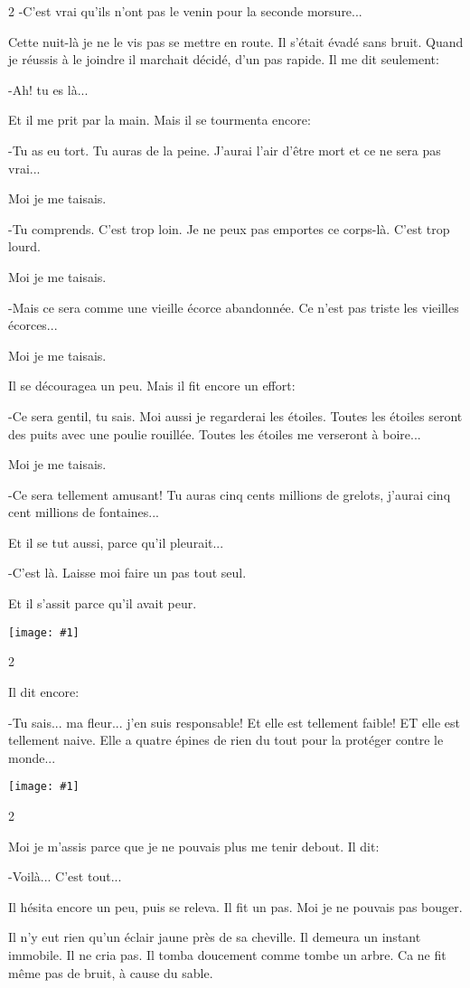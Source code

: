 \documentclass{report}
\newcommand{\incpic}[1]{%
\end{paracol}
\begin{center}
    \texttt{[image: \#1]}
\end{center}
\begin{paracol}{2}}
\begin{document}
\begin{paracol}{2}
-C'est vrai qu'ils n'ont pas le venin pour la seconde morsure...

Cette nuit-là je ne le vis pas se mettre en route. Il s'était évadé sans bruit. Quand je réussis à le joindre il marchait décidé, d'un pas rapide. Il me dit seulement:

-Ah! tu es là...

Et il me prit par la main. Mais il se tourmenta encore:

-Tu as eu tort. Tu auras de la peine. J'aurai l'air d'être mort et ce ne sera pas vrai...

Moi je me taisais.

-Tu comprends. C'est trop loin. Je ne peux pas emportes ce corps-là. C'est trop lourd.

Moi je me taisais.

-Mais ce sera comme une vieille écorce abandonnée. Ce n'est pas triste les vieilles écorces...

Moi je me taisais.

Il se découragea un peu. Mais il fit encore un effort:

-Ce sera gentil, tu sais. Moi aussi je regarderai les étoiles. Toutes les étoiles seront des puits avec une poulie rouillée. Toutes les étoiles me verseront à boire...

Moi je me taisais.

-Ce sera tellement amusant! Tu auras cinq cents millions de grelots, j'aurai cinq cent millions de fontaines...

Et il se tut aussi, parce qu'il pleurait...

-C'est là. Laisse moi faire un pas tout seul.

Et il s'assit parce qu'il avait peur. 

\incpic{pic/image43.jpeg}

Il dit encore:

-Tu sais... ma fleur... j'en suis responsable! Et elle est tellement faible! ET elle est tellement naive. Elle a quatre épines de rien du tout pour la protéger contre le monde... 

\incpic{pic/image44.jpeg}

Moi je m'assis parce que je ne pouvais plus me tenir debout. Il dit:

-Voilà... C'est tout...

Il hésita encore un peu, puis se releva. Il fit un pas. Moi je ne pouvais pas bouger.

Il n'y eut rien qu'un éclair jaune près de sa cheville. Il demeura un instant immobile. Il ne cria pas. Il tomba doucement comme tombe un arbre. Ca ne fit même pas de bruit, à cause du sable. 


\end{paracol}
\end{document}
